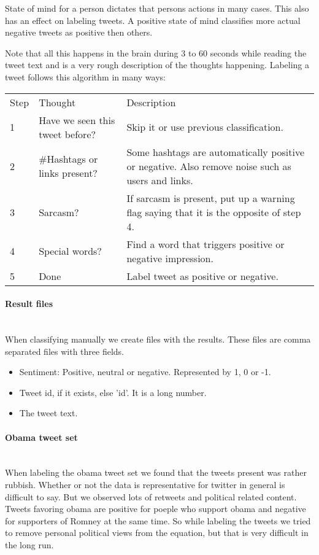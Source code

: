 State of mind for a person dictates that persons actions in many cases. This
also has an effect on labeling tweets. A positive state of mind classifies more
actual negative tweets as positive then others.

Note that all this happens in the brain during 3 to 60 seconds while reading
the tweet text and is a very rough description of the thoughts happening.
Labeling a tweet follows this algorithm in many ways:

\begin{tabular}{ l p{5cm} p{7cm} }
Step & Thought & Description \\
1 & Have we seen this tweet before? & Skip it or use previous classification. \\
2 & \#Hashtags or links present? & Some hashtags are automatically positive or
negative. Also remove noise such as users and links.\\
3 & Sarcasm? & If sarcasm is present, put up a warning flag saying that it is
the opposite of step 4.\\
4 & Special words? & Find a word that triggers positive or negative
impression.\\
5 & Done & Label tweet as positive or negative.\\
\end{tabular}

\paragraph{Result files}
\hspace{0pt}\\
When classifying manually we create files with the results. These files
are comma separated files with three fields.
\begin{itemize}
    \item Sentiment: Positive, neutral or negative. Represented by 1, 0 or -1.
    \item Tweet id, if it exists, else 'id'. It is a long number.
    \item The tweet text.
\end{itemize}

\paragraph{Obama tweet set}
\hspace{0pt}\\
When labeling the obama tweet set we found that the tweets present was rather
rubbish. Whether or not the data is representative for twitter in general is
difficult to say. But we observed lots of retweets and political related
content. Tweets favoring obama are positive for poeple who support obama and
negative for supporters of Romney at the same time. So while labeling the
tweets we tried to remove personal political views from the equation, but that
is very difficult in the long run.  

